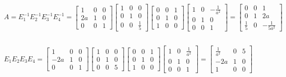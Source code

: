 \documentclass[a4paper,12pt]{article}
\begin{document}
\[
A = E^{-1}_1E^{-1}_2E^{-1}_3E^{-1}_4 = 
\left[\begin{array}{ccc}
    1 & 0 & 0 \\
    2a & 1 & 0 \\
    0 & 0 & 1
\end{array}\right]
\left[\begin{array}{ccc}
    1 & 0 & 0 \\
    0 & 1 & 0 \\
    0 & 0 & \frac{1}{5}
\end{array}\right]
\left[\begin{array}{ccc}
    0 & 0 & 1 \\
    0 & 1 & 0 \\
    1 & 0 & 0
\end{array}\right]
\left[\begin{array}{ccc}
    1 & 0 & -\frac{1}{a^2} \\
    0 & 1 & 0 \\
    0 & 0 & 1
\end{array}\right]
=
\left[\begin{array}{ccc}
    0 & 0 & 1 \\
    0 & 1 & 2a \\
    \frac{1}{5} & 0 & -\frac{1}{5a^2}
\end{array}\right]
\]

\subsection{}
\[
E_1 E_2 E_3 E_4 = 
\left[\begin{array}{ccc}
    1 & 0 & 0 \\
    -2a & 1 & 0 \\
    0 & 0 & 1
\end{array}\right]
\left[\begin{array}{ccc}
    1 & 0 & 0 \\
    0 & 1 & 0 \\
    0 & 0 & 5
\end{array}\right]
\left[\begin{array}{ccc}
    0 & 0 & 1 \\
    0 & 1 & 0 \\
    1 & 0 & 0
\end{array}\right]
\left[\begin{array}{ccc}
    1 & 0 & \frac{1}{a^2} \\
    0 & 1 & 0 \\
    0 & 0 & 1
\end{array}\right]
=
\left[\begin{array}{ccc}
    \frac{1}{a^2} & 0 & 5 \\
    -2a & 1 & 0 \\
    1 & 0 & 0
\end{array}\right]
\]\\
\end{document}
